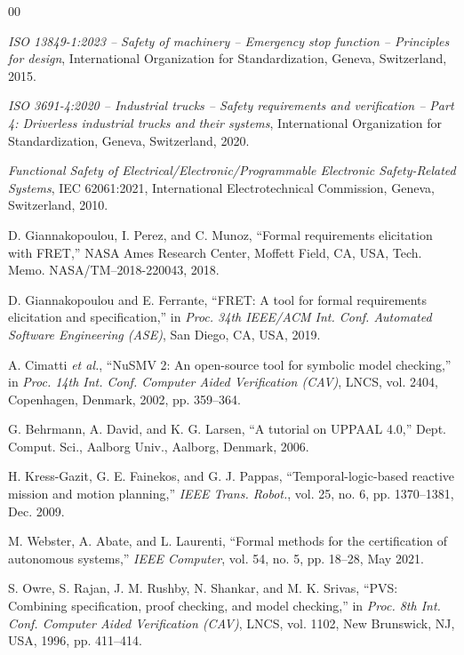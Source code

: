 \documentclass{ieeeaccess}
\theoremstyle{definition}
\begin{document}
\begin{thebibliography}{00}

 
\emph{ISO 13849-1:2023 -- Safety of machinery -- Emergency stop function -- Principles for design}, International Organization for Standardization, Geneva, Switzerland, 2015.
 
\emph{ISO 3691-4:2020 -- Industrial trucks -- Safety requirements and verification -- Part 4: Driverless industrial trucks and their systems}, International Organization for Standardization, Geneva, Switzerland, 2020.
 
\emph{Functional Safety of Electrical/Electronic/Programmable Electronic Safety-Related Systems}, IEC 62061:2021, International Electrotechnical Commission, Geneva, Switzerland, 2010.
 
D. Giannakopoulou, I. Perez, and C. Munoz, ``Formal requirements elicitation with FRET,'' NASA Ames Research Center, Moffett Field, CA, USA, Tech. Memo. NASA/TM--2018-220043, 2018.
 
D. Giannakopoulou and E. Ferrante, ``FRET: A tool for formal requirements elicitation and specification,'' in \emph{Proc. 34th IEEE/ACM Int. Conf. Automated Software Engineering (ASE)}, San Diego, CA, USA, 2019.
 
A. Cimatti \emph{et al.}, ``NuSMV 2: An open-source tool for symbolic model checking,'' in \emph{Proc. 14th Int. Conf. Computer Aided Verification (CAV)}, LNCS, vol. 2404, Copenhagen, Denmark, 2002, pp. 359--364.
 
G. Behrmann, A. David, and K. G. Larsen, ``A tutorial on UPPAAL 4.0,'' Dept. Comput. Sci., Aalborg Univ., Aalborg, Denmark, 2006.
 
H. Kress-Gazit, G. E. Fainekos, and G. J. Pappas, ``Temporal-logic-based reactive mission and motion planning,'' \emph{IEEE Trans. Robot.}, vol. 25, no. 6, pp. 1370--1381, Dec. 2009.
 
M. Webster, A. Abate, and L. Laurenti, ``Formal methods for the certification of autonomous systems,'' \emph{IEEE Computer}, vol. 54, no. 5, pp. 18--28, May 2021.
 
S. Owre, S. Rajan, J. M. Rushby, N. Shankar, and M. K. Srivas, ``PVS: Combining specification, proof checking, and model checking,'' in \emph{Proc. 8th Int. Conf. Computer Aided Verification (CAV)}, LNCS, vol. 1102, New Brunswick, NJ, USA, 1996, pp. 411--414.
 

\end{thebibliography}
\end{document}
